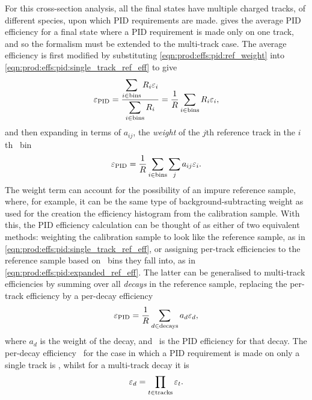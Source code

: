 For this cross-section analysis, all the final states have multiple charged
tracks, of different species, upon which \ac{PID} requirements are made.
 gives the average \ac{PID}
efficiency for a final state where a \ac{PID} requirement is made only on one
track, and so the formalism must be extended to the multi-track case.
The average efficiency is first modified by substituting
\cref{eqn:prod:effs:pid:ref_weight} into
\cref{eqn:prod:effs:pid:single_track_ref_eff} to give
\begin{equation}
  \effpid = \frac{%
    \displaystyle\sum_{i \in \textnormal{bins}} R_{i}\eff_{i}
  }{%
    \displaystyle\sum_{i \in \textnormal{bins}} R_{i}
  }
  = \frac{1}{R}\sum_{i \in \textnormal{bins}} R_{i}\eff_{i},
\end{equation}
and then expanding in terms of $a_{ij}$, the \emph{weight} of the $j$th
reference track in the $i$th \ptotetanspd\ bin
\begin{equation}
  \varepsilon_{\textnormal{PID}} = \frac{1}{R}
            \sum_{i \in \textnormal{bins}}\sum_{j} a_{ij}\varepsilon_{i}.
  \label{eqn:prod:effs:pid:expanded_ref_eff}
\end{equation}
The weight term can account for the possibility of an impure reference sample,
where, for example, it can be the same type of background-subtracting weight as
used for the creation the efficiency histogram from the calibration sample.
With this, the \ac{PID} efficiency calculation can be thought of as either of
two equivalent methods: weighting the calibration sample to look like the
reference sample, as in \cref{eqn:prod:effs:pid:single_track_ref_eff}, or
assigning per-track efficiencies to the reference sample based on \ptotetanspd\
bins they fall into, as in \cref{eqn:prod:effs:pid:expanded_ref_eff}.
The latter can be generalised to multi-track efficiencies by summing over all
\emph{decays} in the reference sample, replacing the per-track efficiency by a
per-decay efficiency \effpiddecay
\begin{equation}
  \varepsilon_{\textnormal{PID}} = \frac{1}{R}\sum_{d\in\text{decays}} a_{d}\varepsilon_{d},
\end{equation}
where $a_{d}$ is the weight of the decay, and \effpiddecay\ is the \ac{PID}
efficiency for that decay.
The per-decay efficiency \effpiddecay\ for the case in which a \ac{PID}
requirement is made on only a single track is \effpidtrack, whilst for a
multi-track decay it is
\begin{equation}
  \varepsilon_{d} = \prod_{t \in \textnormal{tracks}} \varepsilon_{t}.
\end{equation}

